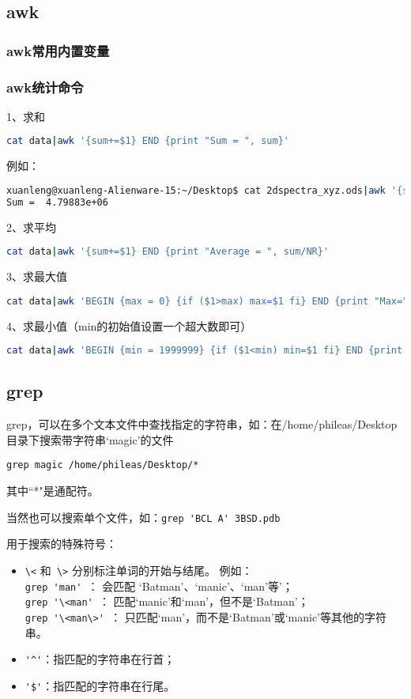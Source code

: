 \subsection{awk}
\subsubsection{awk常用内置变量}


\subsubsection{awk统计命令}
1、求和
\begin{lstlisting}[language=sh]
cat data|awk '{sum+=$1} END {print "Sum = ", sum}'
\end{lstlisting}
例如：
\begin{lstlisting}[language=sh]
xuanleng@xuanleng-Alienware-15:~/Desktop$ cat 2dspectra_xyz.ods|awk '{sum+=$1} END {print "Sum = ", sum}'
Sum =  4.79883e+06
\end{lstlisting}

2、求平均
\begin{lstlisting}[language=sh]
cat data|awk '{sum+=$1} END {print "Average = ", sum/NR}'
\end{lstlisting}

3、求最大值
\begin{lstlisting}[language=sh]
cat data|awk 'BEGIN {max = 0} {if ($1>max) max=$1 fi} END {print "Max=", max}'
\end{lstlisting}

4、求最小值（min的初始值设置一个超大数即可）
\begin{lstlisting}[language=sh]
cat data|awk 'BEGIN {min = 1999999} {if ($1<min) min=$1 fi} END {print "Min=", min}'
\end{lstlisting}



\subsection{grep}
grep，可以在多个文本文件中查找指定的字符串，如：在/home/phileas/Desktop目录下搜索带字符串‘magic’的文件

\verb|grep magic /home/phileas/Desktop/*|

其中``*"是通配符。

当然也可以搜索单个文件，如：\verb*[grep 'BCL A' 3BSD.pdb[

用于搜索的特殊符号：
\begin{itemize}
\item \verb|\<| 和\verb| \>| 分别标注单词的开始与结尾。 例如：\\ 
\verb|grep 'man' |： 会匹配 ‘Batman’、‘manic’、‘man’等'；\\
\verb|grep '\<man' |： 匹配‘manic’和‘man’，但不是‘Batman’；\\ 
\verb|grep '\<man\>' |： 只匹配‘man’，而不是‘Batman’或‘manic’等其他的字符串。 

\item \verb|'^'|：指匹配的字符串在行首；

\item \verb|'$'|：指匹配的字符串在行尾。
\end{itemize}


